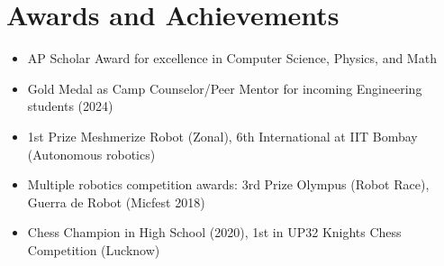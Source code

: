 \documentclass[letterpaper,10pt]{article}
\begin{document}
\section{Awards and Achievements}
\begin{itemize}[leftmargin=0.15in, label={--}]
  \item\small{AP Scholar Award for excellence in Computer Science, Physics, and Math}\vspace{-5pt}
  \item\small{Gold Medal as Camp Counselor/Peer Mentor for incoming Engineering students (2024)}\vspace{-5pt}
  \item\small{1st Prize Meshmerize Robot (Zonal), 6th International at IIT Bombay (Autonomous robotics)}\vspace{-5pt}
  \item\small{Multiple robotics competition awards: 3rd Prize Olympus (Robot Race), Guerra de Robot (Micfest 2018)}\vspace{-5pt}
  \item\small{Chess Champion in High School (2020), 1st in UP32 Knights Chess Competition (Lucknow)}\vspace{-5pt}
\end{itemize}
\end{document}
